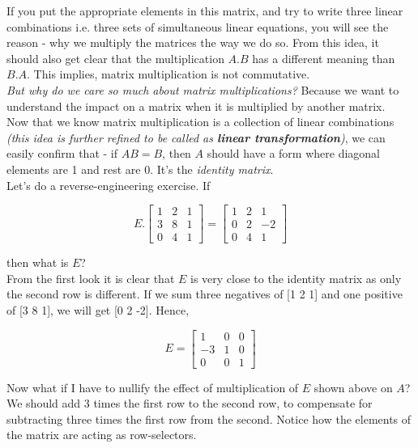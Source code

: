 If you put the appropriate elements in this matrix, and try to write three linear combinations i.e. three sets of simultaneous linear equations, you will see the reason - why we multiply the matrices the way we do so. From this idea, it should also get clear that the multiplication $A.B$ has a different meaning than $B.A$. This implies, matrix multiplication is not commutative.\\

\textit{But why do we care so much about matrix multiplications?} Because we want to understand the impact on a matrix when it is multiplied by another matrix. \\

Now that we know matrix multiplication is a collection of linear combinations \textit{(this idea is further refined to be called as \textbf{linear transformation})}, we can easily confirm that - if $AB = B$, then $A$ should have a form where diagonal elements are 1 and rest are 0. It's the \textit{identity matrix}. \\

Let's do a reverse-engineering exercise. If

\begin{equation}
    E.
    \begin{bmatrix}
        1 & 2 & 1 \\
        3 & 8 & 1 \\
        0 & 4 & 1
    \end{bmatrix}
    =
    \begin{bmatrix}
        1 & 2 & 1 \\
        0 & 2 & -2 \\
        0 & 4 & 1
    \end{bmatrix}
\end{equation}

then what is $E$? \\

From the first look it is clear that $E$ is very close to the identity matrix as only the second row is different. If we sum three negatives of [1 2 1] and one positive of [3 8 1], we will get [0 2 -2]. Hence, 

$$
E =
\begin{bmatrix}
    1 & 0 & 0 \\
    -3 & 1 & 0 \\
    0 & 0 & 1
\end{bmatrix}
$$

Now what if I have to nullify the effect of multiplication of $E$ shown above on $A$? We should add 3 times the first row to the second row, to compensate for subtracting three times the first row from the second. Notice how the elements of the matrix are acting as row-selectors. 

